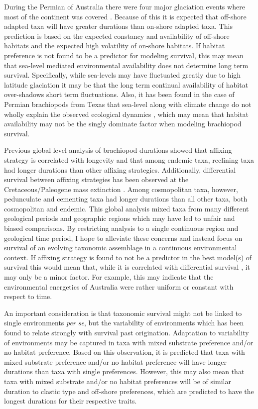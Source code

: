 \documentclass[12pt,letterpaper]{article}
\begin{document}
During the Permian of Australia there were four major glaciation events where most of the continent was covered \citep{Fielding2008,Birgenheier2010,Fielding2008a,Fielding2006}. Because of this it is expected that off-shore adapted taxa will have greater durations than on-shore adapted taxa. This prediction is based on the expected constancy and availability of off-shore habitats and the expected high volatility of on-shore habitats. If habitat preference is not found to be a predictor for modeling survival, this may mean that sea-level mediated environmental availability does not determine long term survival. Specifically, while sea-levels may have fluctuated greatly due to high latitude glaciation \citep{Fielding2008,Fielding2008a,Birgenheier2010} it may be that the long term continual availability of habitat over-shadows short term fluctuations. Also, it has been found in the case of Permian brachiopods from Texas that sea-level along with climate change do not wholly explain the observed ecological dynamics \citep{Olszewski2004}, which may mean that habitat availability may not be the singly dominate factor when modeling brachiopod survival. 

Previous global level analysis of brachiopod durations showed that affixing strategy is correlated with longevity \citep{Alexander1977} and that among endemic taxa, reclining taxa had longer durations than other affixing strategies. Additionally, differential survival between affixing strategies has been observed at the Cretaceous/Paleogene mass extinction \citep{Johansen1989}. Among cosmopolitan taxa, however, pedunculate and cementing taxa had longer durations than all other taxa, both cosmopolitan and endemic. This global analysis mixed taxa from many different geological periods and geographic regions which may have led to unfair and biased comparisons. By restricting analysis to a single continuous region and geological time period, I hope to alleviate these concerns and instead focus on survival of an evolving taxonomic assemblage in a continuous environmental context.  If affixing strategy is found to not be a predictor in the best model(s) of survival this would mean that, while it is correlated with differential survival \citep{Alexander1977}, it may only be a minor factor. For example, this may indicate that the environmental energetics of Australia were rather uniform or constant with respect to time.

An important consideration is that taxonomic survival might not be linked to single environments \textit{per se}, but the variability of environments \citep{Foote2013,Heim2011,Liow2007b} which has been found to relate strongly with survival past origination. Adaptation to variability of environments may be captured in taxa with mixed substrate preference and/or no habitat preference. Based on this observation, it is predicted that taxa with mixed substrate preference and/or no habitat preference will have longer durations than taxa with single preferences. However, this may also mean that taxa with mixed substrate and/or no habitat preferences will be of similar duration to clastic type and off-shore preferences, which are predicted to have the longest durations for their respective traits.
\end{document}
